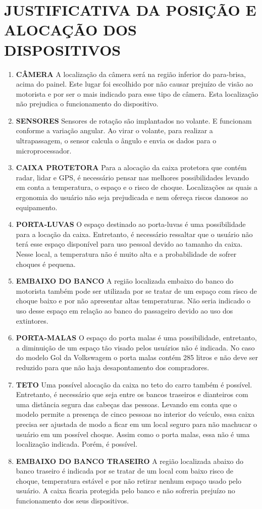 \chapter[JUSTIFICATIVA DA POSIÇÃO E ALOCAÇÃO DOS DISPOSITIVOS]{JUSTIFICATIVA DA POSIÇÃO E ALOCAÇÃO DOS DISPOSITIVOS}
\begin{enumerate}
\item \textbf{CÂMERA}
A localização da câmera será na região inferior do para-brisa, acima do painel. Este lugar foi escolhido por não causar prejuízo de visão ao motorista e por ser o mais indicado para esse tipo de câmera. Esta localização não prejudica o funcionamento do dispositivo.
\item \textbf{SENSORES}
Sensores de rotação são implantados no volante. E funcionam conforme a variação angular. Ao virar o volante, para realizar a ultrapassagem, o sensor calcula o ângulo e envia os dados para o microprocessador.
\item \textbf{CAIXA PROTETORA}
Para a alocação da caixa protetora que contém radar, lidar e GPS, é necessário pensar nas melhores possibilidades levando em conta a temperatura, o espaço e o risco de choque. Localizações as quais a ergonomia do usuário não seja prejudicada e nem ofereça riscos danosos ao equipamento.
\item \textbf{PORTA-LUVAS}
O espaço destinado ao porta-luvas é uma possibilidade para a locação da caixa. Entretanto, é necessário ressaltar que o usuário não terá esse espaço disponível para uso pessoal devido ao tamanho da caixa. Nesse local, a temperatura não é muito alta e a probabilidade de sofrer choques é pequena.
\item \textbf{EMBAIXO DO BANCO}
A região localizada embaixo do banco do motorista também pode ser utilizada por se tratar de um espaço com risco de choque baixo e por não apresentar altas temperaturas. Não seria indicado o uso desse espaço em relação ao banco do passageiro devido ao uso dos extintores.
\item \textbf{PORTA-MALAS}
O espaço do porta malas é uma possibilidade, entretanto, a diminuição de um espaço tão visado pelos usuários não é indicada. No caso do modelo Gol da Volkswagem o porta malas contém 285 litros e não deve ser reduzido para que não haja desapontamento dos compradores.
\item \textbf{TETO}
Uma possível alocação da caixa no teto do carro também é possível. Entretanto, é necessário que seja entre os bancos traseiros e dianteiros com uma distância segura das cabeças das pessoas. Levando em conta que o modelo permite a presença de cinco pessoas no interior do veículo, essa caixa precisa ser ajustada de modo a ficar em um local seguro para não machucar o usuário em um possível choque. Assim como o porta malas, essa não é uma localização indicada. Porém, é possível.
\item \textbf{EMBAIXO DO BANCO TRASEIRO}
A região localizada abaixo do banco traseiro é indicada por se tratar de um local com baixo risco de choque, temperatura estável e por não retirar nenhum espaço usado pelo usuário. A caixa ficaria protegida pelo banco e não sofreria prejuízo no funcionamento dos seus dispositivos.
\end{enumerate}
